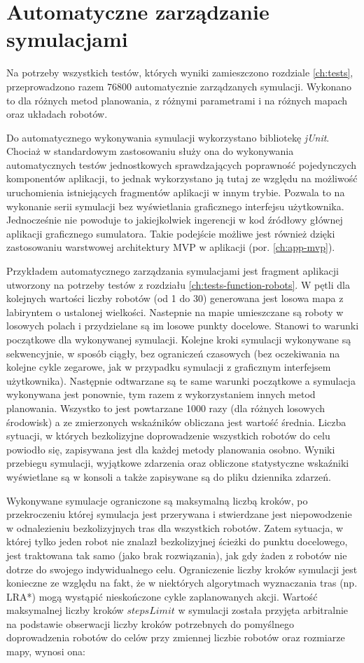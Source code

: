 \section{Automatyczne zarządzanie symulacjami}
Na potrzeby wszystkich testów, których wyniki zamieszczono rozdziale \ref{ch:tests}, przeprowadzono razem $76 800$ automatycznie zarządzanych symulacji. Wykonano to dla różnych metod planowania, z różnymi parametrami i na różnych mapach oraz układach robotów.

Do automatycznego wykonywania symulacji wykorzystano bibliotekę {\it jUnit}. Chociaż w standardowym zastosowaniu służy ona do wykonywania automatycznych testów jednostkowych sprawdzających poprawność pojedynczych komponentów aplikacji, to jednak wykorzystano ją tutaj ze względu na możliwość uruchomienia istniejących fragmentów aplikacji w innym trybie.
Pozwala to na wykonanie serii symulacji bez wyświetlania graficznego interfejsu użytkownika.
Jednocześnie nie powoduje to jakiejkolwiek ingerencji w kod źródłowy głównej aplikacji graficznego sumulatora.
Takie podejście możliwe jest również dzięki zastosowaniu warstwowej architektury MVP w aplikacji (por. \ref{ch:app-mvp}).

Przykładem automatycznego zarządzania symulacjami jest fragment aplikacji utworzony na potrzeby testów z rozdziału \ref{ch:tests-function-robots}.
W pętli dla kolejnych wartości liczby robotów (od 1 do 30) generowana jest losowa mapa z labiryntem o ustalonej wielkości.
Nastepnie na mapie umieszczane są roboty w losowych polach i przydzielane są im losowe punkty docelowe.
Stanowi to warunki początkowe dla wykonywanej symulacji. Kolejne kroki symulacji wykonywane są sekwencyjnie, w sposób ciągły, bez ograniczeń czasowych (bez oczekiwania na kolejne cykle zegarowe, jak w przypadku symulacji z graficznym interfejsem użytkownika).
Następnie odtwarzane są te same warunki początkowe a symulacja wykonywana jest ponownie, tym razem z wykorzystaniem innych metod planowania.
Wszystko to jest powtarzane 1000 razy (dla różnych losowych środowisk) a ze zmierzonych wskaźników obliczana jest wartość średnia.
Liczba sytuacji, w których bezkolizyjne doprowadzenie wszystkich robotów do celu powiodło się, zapisywana jest dla każdej metody planowania osobno.
Wyniki przebiegu symulacji, wyjątkowe zdarzenia oraz obliczone statystyczne wskaźniki wyświetlane są w konsoli a także zapisywane są do pliku dziennika zdarzeń.

Wykonywane symulacje ograniczone są maksymalną liczbą kroków, po przekroczeniu której symulacja jest przerywana i stwierdzane jest niepowodzenie w odnalezieniu bezkolizyjnych tras dla wszystkich robotów.
Zatem sytuacja, w której tylko jeden robot nie znalazł bezkolizyjnej ścieżki do punktu docelowego, jest traktowana tak samo (jako brak rozwiązania), jak gdy żaden z robotów nie dotrze do swojego indywidualnego celu.
Ograniczenie liczby kroków symulacji jest konieczne ze względu na fakt, że w niektórych algorytmach wyznaczania tras (np. LRA*) mogą wystąpić nieskończone cykle zaplanowanych akcji.
Wartość maksymalnej liczby kroków $stepsLimit$ w symulacji została przyjęta arbitralnie na podstawie obserwacji liczby kroków potrzebnych do pomyślnego doprowadzenia robotów do celów przy zmiennej liczbie robotów oraz rozmiarze mapy, wynosi ona:

